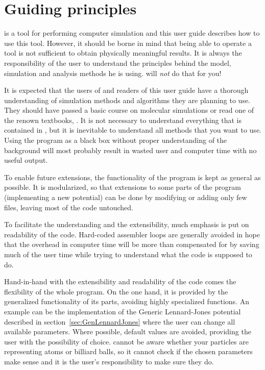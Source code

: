 \section{Guiding principles}
\label{sec:ideas}

\es is a tool for performing computer simulation and this user guide
describes how to use this tool. However, it should be borne in mind
that being able to operate a tool is not sufficient to obtain 
physically meaningful results. It is always the responsibility of the user
to understand the principles behind the model, simulation
and analysis methods he is using. \es will \emph{not} do that for you!

It is expected that the users of \es and readers of this user guide
have a thorough understanding of simulation methods and algorithms
they are planning to use. They should have passed a basic course on
molecular simulations or read one of the renown textbooks, \eg
\cite{frenkel02b}.  It is not necessary to understand everything that
is contained in \es, but it is inevitable to understand all methods
that you want to use.  Using the program as a black box without
proper understanding of the background will most probably result in
wasted user and computer time with no useful output.

To enable future extensions, the functionality of the program is kept
as general as possible.  It is modularized, so that extensions to some
parts of the program (\eg implementing a new potential) can be done by
modifying or adding only few files, leaving most of the code
untouched.

To facilitate the understanding and the extensibility, much emphasis
is put on readability of the code.  Hard-coded assembler loops are
generally avoided in hope that the overhead in computer time will be
more than compensated for by saving much of the user time while trying
to understand what the code is supposed to do.

Hand-in-hand with the extensibility and readability of the code comes
the flexibility of the whole program.  On the one hand, it is provided
by the generalized functionality of its parts, avoiding highly
specialized functions.  An example can be the implementation of the
Generic Lennard-Jones potential described in
section~\ref{sec:GenLennardJones} where the user can change all
available parameters. Where possible, default values are avoided,
providing the user with the possibility of choice.  \es cannot be
aware whether your particles are representing atoms or billiard balls, so
it cannot check if the chosen parameters make sense and it is the
user's responsibility to make sure they do.

